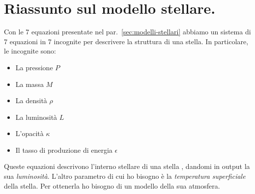 \section{Riassunto sul modello stellare.}
Con le 7 equazioni presentate nel par.~\ref{sec:modelli-stellari} abbiamo un sistema di 7 equazioni in 7 incognite per descrivere la struttura di una stella. In particolare, le incognite sono:
\begin{itemize}
    \item La pressione $P$
    \item La massa $M$
    \item La densità $\rho$
    \item La luminosità $L$
    \item L'opacità $\kappa$
    \item Il tasso di produzione di energia $\epsilon$
\end{itemize}
Queste equazioni descrivono l'interno stellare di una stella , dandomi in output la sua \emph{luminosità}. L'altro parametro di cui ho bisogno è la \emph{temperatura superficiale} della stella. Per ottenerla ho bisogno di un modello della sua atmosfera.